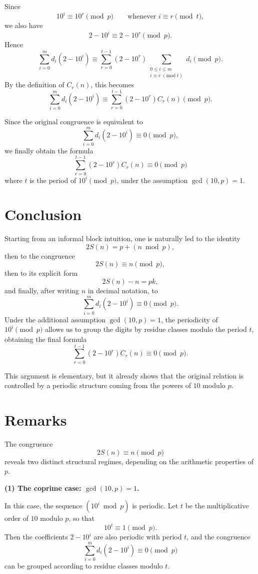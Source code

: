 \documentclass[12pt]{article}
\begin{document}
Since
\[
10^i\equiv 10^r \pmod p \qquad \text{whenever } i\equiv r \pmod t,
\]
we also have
\[
2-10^i\equiv 2-10^r \pmod p.
\]
Hence
\[
\sum_{i=0}^m d_i(2-10^i)
\equiv
\sum_{r=0}^{t-1}(2-10^r)\!\!\sum_{\substack{0\leq i\leq m\\ i\equiv r\;(\mathrm{mod}\; t)}} d_i
\pmod p.
\]
By the definition of \(C_r(n)\), this becomes
\[
\sum_{i=0}^m d_i(2-10^i)
\equiv
\sum_{r=0}^{t-1}(2-10^r)C_r(n)
\pmod p.
\]

Since the original congruence is equivalent to
\[
\sum_{i=0}^m d_i(2-10^i)\equiv 0 \pmod p,
\]
we finally obtain the formula
\[
\boxed{
\sum_{r=0}^{t-1}(2-10^r)C_r(n)\equiv 0 \pmod p
}
\]
where \(t\) is the period of \(10^i \pmod p\), under the assumption \(\gcd(10,p)=1\).

\section*{Conclusion}

Starting from an informal block intuition, one is naturally led to the identity
\[
2S(n)=p+(n \bmod p),
\]
then to the congruence
\[
2S(n)\equiv n \pmod p,
\]
then to its explicit form
\[
2S(n)-n=pk,
\]
and finally, after writing \(n\) in decimal notation, to
\[
\sum_{i=0}^m d_i(2-10^i)\equiv 0 \pmod p.
\]
Under the additional assumption \(\gcd(10,p)=1\), the periodicity of \(10^i \pmod p\) allows us to group the digits by residue classes modulo the period \(t\), obtaining the final formula
\[
\sum_{r=0}^{t-1}(2-10^r)C_r(n)\equiv 0 \pmod p.
\]

\medskip

\noindent
This argument is elementary, but it already shows that the original relation is controlled by a periodic structure coming from the powers of \(10\) modulo \(p\).
\section*{Remarks}

The congruence
\[
2S(n)\equiv n \pmod{p}
\]
reveals two distinct structural regimes, depending on the arithmetic properties of $p$.

\medskip

\textbf{(1) The coprime case: $\gcd(10,p)=1$.}

In this case, the sequence $(10^i \bmod p)$ is periodic. Let $t$ be the multiplicative order of $10$ modulo $p$, so that
\[
10^t \equiv 1 \pmod{p}.
\]
Then the coefficients $2 - 10^i$ are also periodic with period $t$, and the congruence
\[
\sum_{i=0}^m d_i(2-10^i)\equiv 0 \pmod{p}
\]
can be grouped according to residue classes modulo $t$.
\end{document}

